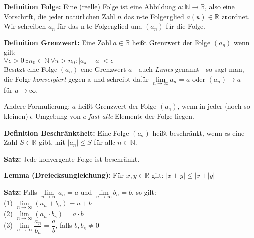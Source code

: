 \documentclass[a4paper]{article}
\begin{document}
\parindent 0mm


\textbf{Definition Folge:} Eine (reelle) Folge ist eine Abbildung $a: \mathbb{N} \rightarrow \mathbb{R}$, also
eine Vorschrift, die jeder natürlichen Zahl $n$ das n-te Folgenglied $a(n) \in \mathbb{R}$ zuordnet.
Wir schreiben $a_n$ für das n-te Folgenglied und $(a_n)$ für die Folge.
\bigskip

\textbf{Definition Grenzwert:} Eine Zahl $a \in \mathbb{R}$ heißt Grenzwert der Folge $(a_n)$ wenn gilt: \\
$\forall \epsilon > 0 \, \exists n_0 \in \mathbb{N} \, \forall n > n_0 : \vert a_n - a \vert < \epsilon$ \\

Besitzt eine Folge $(a_n)$ eine Grenzwert $a$ - auch \textit{Limes} genannt - so sagt man, die Folge \textit{konvergiert} 
gegen a und schreibt dafür $\lim \limits_{n \to \infty} a_n = a$ oder $(a_n) \rightarrow a$ für $a \rightarrow \infty$.

Andere Formulierung: $a$ heißt Grenzwert der Folge $(a_n)$, wenn in jeder (noch so kleinen) $\epsilon$-Umgebung von $a$ \textit{fast alle} Elemente der Folge liegen.

\bigskip

\textbf{Definition Beschränktheit:} Eine Folge $(a_n)$ heißt beschränkt, wenn es eine Zahl $S \in \mathbb{R}$ gibt, mit 
$\vert a_n \vert \le S$ für alle $n \in \mathbb{N}$.
\bigskip

\textbf{Satz:} Jede konvergente Folge ist beschränkt.
\bigskip

\textbf{Lemma (Dreiecksungleichung):} Für $x,y \in \mathbb{R}$ gilt: $\vert x+y \vert 
\le \vert x \vert + \vert y \vert$
\bigskip

\textbf{Satz:} Falls  $\lim \limits_{n \to \infty} a_n = a$ und $\lim \limits_{n \to \infty} b_n = b$, so gilt:\\
(1)  $\lim \limits_{n \to \infty} (a_n + b_n)= a + b$ \\
(2)  $\lim \limits_{n \to \infty} (a_n \cdot b_n)= a \cdot b$ \\
(3)  $\lim \limits_{n \to \infty} \dfrac{a_n}{b_n}= \dfrac{a}{b}$, falls $b, b_n\neq 0$
\bigskip
\end{document}
